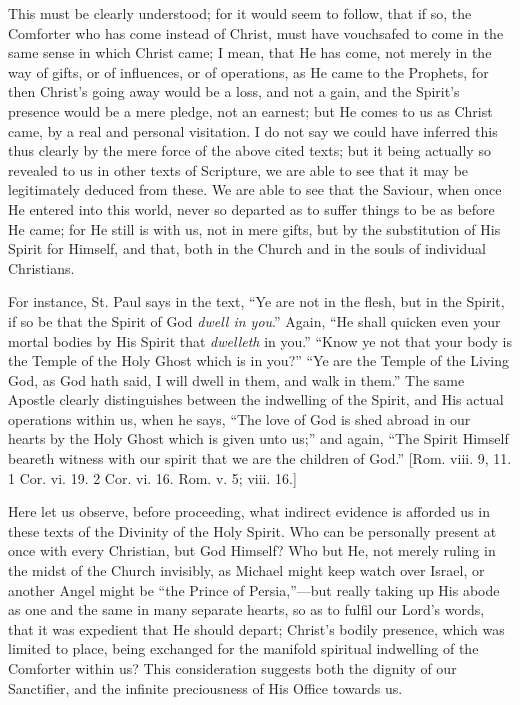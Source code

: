 This must be clearly understood; for it would seem to follow, that if
so, the Comforter who has come instead of Christ, must have vouchsafed
to come in the same sense in which Christ came; I mean, that He has
come, not merely in the way of gifts, or of influences, or of
operations, as He came to the Prophets, for then Christ's going away
would be a loss, and not a gain, and the Spirit's presence would be a
mere pledge, not an earnest; but He comes to us as Christ came, by a
real and personal visitation. I do not say we could have inferred this
thus clearly by the mere force of the above cited texts; but it being
actually so revealed to us in other texts of Scripture, we are able to
see that it may be legitimately deduced from these. We are able to see
that the Saviour, when once He entered into this world, never so
departed as to suffer things to be as before He came; for He still is
with us, not in mere gifts, but by the substitution of His Spirit for
Himself, and that, both in the Church and in the souls of individual
Christians.

For instance, St. Paul says in the text, ``Ye are not in the
flesh, but in the Spirit, if so be that the Spirit of God \emph{dwell in
you}.'' Again, ``He shall quicken even your mortal bodies by
His Spirit that \emph{dwelleth} in you.'' ``Know ye not that
your body is the Temple of the Holy Ghost which is in you?''
``Ye are the Temple of the Living God, as God hath said, I will
dwell in them, and walk in them.'' The same Apostle clearly
distinguishes between the indwelling of the Spirit, and His actual
operations within us, when he says, ``The love of God is shed abroad
in our hearts by the Holy Ghost which is given unto us;'' and again,
``The Spirit Himself beareth witness with our spirit that we are the
children of God.'' [Rom. viii. 9, 11. 1 Cor. vi. 19. 2 Cor. vi. 16.
Rom. v. 5; viii. 16.]

Here let us observe, before proceeding, what indirect evidence is
afforded us in these texts of the Divinity of the Holy Spirit. Who can
be personally present at once with every Christian, but God Himself? Who
but He, not merely ruling in the midst of the Church invisibly, as
Michael might keep watch over Israel, or another Angel might be
``the Prince of Persia,''—but really taking up His abode as
one and the same in many separate hearts, so as to fulfil our Lord's
words, that it was expedient that He should depart; Christ's bodily
presence, which was limited to place, being exchanged for the manifold
spiritual indwelling of the Comforter within us? This consideration
suggests both the dignity of our Sanctifier, and the infinite
preciousness of His Office towards us.

